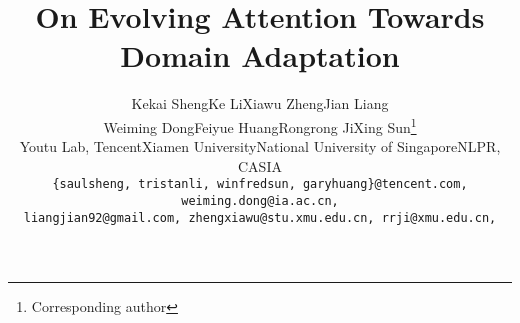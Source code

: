 \documentclass[10pt,twocolumn,letterpaper]{article}
\begin{document}
\title{On Evolving Attention Towards Domain Adaptation}

\author{Kekai Sheng\quad Ke Li\quad Xiawu Zheng\quad Jian Liang\\ Weiming Dong\quad Feiyue Huang\quad Rongrong Ji\quad Xing Sun\thanks{Corresponding author} \\
Youtu Lab, Tencent\quad Xiamen University\quad National University of Singapore\quad NLPR, CASIA \\
{\tt\small \{saulsheng, tristanli, winfredsun, garyhuang\}@tencent.com, weiming.dong@ia.ac.cn,} \\ {\tt\small liangjian92@gmail.com, zhengxiawu@stu.xmu.edu.cn, rrji@xmu.edu.cn,}
}

\maketitle
\ificcvfinal\thispagestyle{empty}\fi

\newcommand{\iMethod}{EvoADA}

\newcommand{\SOTA}{\textit{state-of-the-art}~}

\newcommand{\Sdomain}{\mathcal{S}}
\newcommand{\Tdomain}{\mathcal{T}}
\newcommand{\Sdata}{x^{\mathcal{S}}}
\newcommand{\Slabel}{y^{\mathcal{S}}}
\newcommand{\Snum}{N^{\mathcal{S}}}
\newcommand{\Tdata}{x^{\mathcal{T}}}
\newcommand{\Tnum}{N^{\mathcal{T}}}

\newcommand{\sspace}{\mathcal{A}}

\newcommand{\seed}{\mathcal{G}_{seed}}
\newcommand{\randseed}{\mathcal{G}_{rand}}
\newcommand{\crossover}{\mathcal{G}_{crossover}}
\newcommand{\mutate}{\mathcal{G}_{mutate}}
\newcommand{\best}{\mathcal{G}_{best}}

\newcommand{\RNum}[1]{\uppercase\expandafter{\romannumeral #1\relax}}
\end{document}
